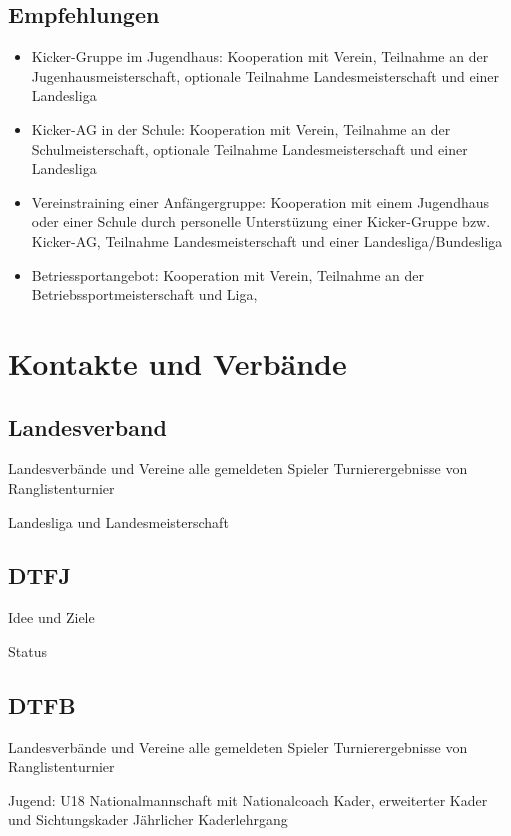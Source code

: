 \subsection{Empfehlungen}
\begin{itemize}
\item Kicker-Gruppe im Jugendhaus: 
Kooperation mit Verein,
Teilnahme an der Jugenhausmeisterschaft,  
optionale Teilnahme Landesmeisterschaft und einer Landesliga
\item Kicker-AG in der Schule: 
Kooperation mit Verein, 
Teilnahme an der Schulmeisterschaft, 
optionale Teilnahme Landesmeisterschaft und einer Landesliga
\item Vereinstraining einer Anfängergruppe: 
Kooperation mit einem Jugendhaus oder einer Schule durch personelle Unterstüzung einer Kicker-Gruppe bzw. Kicker-AG, 
Teilnahme Landesmeisterschaft und einer Landesliga/Bundesliga
\item Betriessportangebot: 
Kooperation mit Verein, 
Teilnahme an der Betriebssportmeisterschaft und Liga,
\end{itemize}


\section{Kontakte und Verbände}

\subsection{Landesverband}

Landesverbände und Vereine
alle gemeldeten Spieler
Turnierergebnisse von Ranglistenturnier 

Landesliga und Landesmeisterschaft

\subsection{DTFJ}

Idee und Ziele

Status

\subsection{DTFB}

Landesverbände und Vereine
alle gemeldeten Spieler
Turnierergebnisse von Ranglistenturnier 

Jugend:
U18 Nationalmannschaft mit Nationalcoach
Kader, erweiterter Kader und Sichtungskader
Jährlicher Kaderlehrgang

